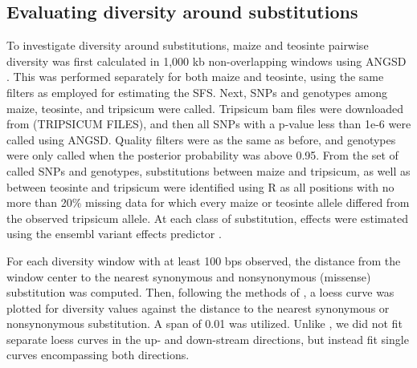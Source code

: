 \documentclass{pnastwo}
\begin{document}
\begin{article}
\begin{materials}
\subsection{Evaluating diversity around substitutions}
To investigate diversity around substitutions, maize and teosinte pairwise diversity was first
calculated in 1,000 kb non-overlapping windows using ANGSD
\cite{angsd}. This was performed separately for both maize and
teosinte, using the same filters as employed for estimating the
SFS. Next, SNPs and genotypes among maize, teosinte, and tripsicum were called. Tripsicum bam files
were downloaded from (TRIPSICUM FILES), and then all SNPs with a
p-value less than 1e-6 were called using ANGSD. Quality filters were
as the same as before, and genotypes were only called when the
posterior probability was above 0.95. From the set of called SNPs and
genotypes, substitutions between maize and tripsicum, as well as
between teosinte and tripsicum were identified using R \cite{R} as all positions with
no more than 20\% missing data for which every maize or teosinte
allele differed from the observed tripsicum allele. At each class of
substitution, effects were estimated using the ensembl variant effects
predictor \cite{vep}.

For each diversity window with at least 100 bps observed, the distance from the window center to the
nearest synonymous and nonsynonymous (missense) substitution was
computed. Then, following the methods of \cite{hernandez11}, a loess
curve was plotted for diversity values against the distance to the
nearest synonymous or nonsynonymous substitution. A span of 0.01 was
utilized. Unlike
\cite{sattath11}, we did not fit separate loess curves in the up- and
down-stream directions, but instead fit single curves encompassing
both directions.


\end{materials}
\end{article}
\end{document}
